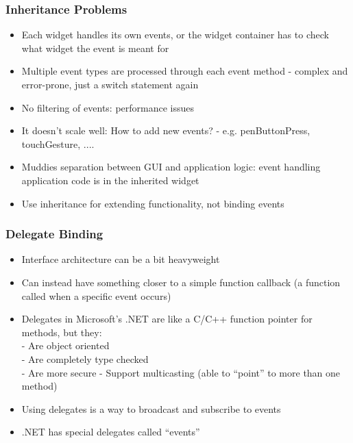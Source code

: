 \documentclass[twoside]{article}
\begin{document}
\subsubsection{Inheritance Problems}
\begin{itemize}
\item Each widget handles its own events, or the widget container has to check what widget the event is meant for
\item Multiple event types are processed through each event method -  complex and error-prone, just a switch statement again
\item No filtering of events: performance issues
\item It doesn’t scale well: How to add new events? -  e.g. penButtonPress, touchGesture, ....
\item Muddies separation between GUI and application logic: event handling application code is in the inherited widget
\item Use inheritance for extending functionality, not binding events

\end{itemize}
\subsubsection{Delegate Binding}
\begin{itemize}
 \item Interface architecture can be a bit heavyweight
\item Can instead have something closer to a simple function callback (a
function called when a specific event occurs)
\item Delegates in Microsoft’s .NET are like a C/C++ function pointer for methods, but they: \\
-  Are object oriented\\
-  Are completely type checked\\
-  Are more secure
-  Support multicasting (able to “point” to more than one method)\\
\item  Using delegates is a way to broadcast and subscribe to events
\item .NET has special delegates called “events”
\end{itemize}
\end{document}
